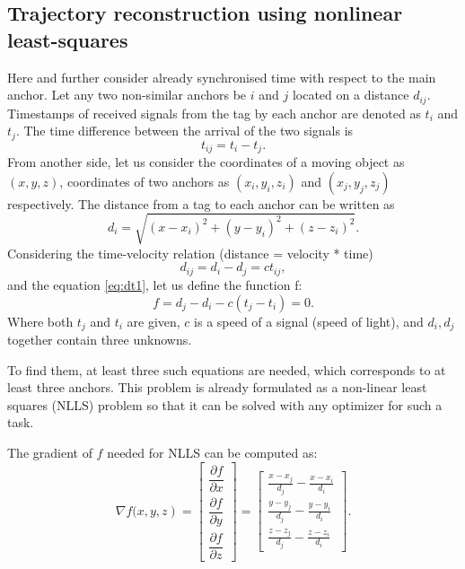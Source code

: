 \documentclass[journal]{IEEEtran}
\begin{document}
\subsection{Trajectory reconstruction using nonlinear least-squares}
\label{sec:traj_recon}
Here and further consider already synchronised time with respect to the main anchor.
Let any two non-similar anchors be $i$ and $j$ located on a distance $d_{ij}$.
Timestamps of received signals from the tag by each anchor are denoted as $t_i$ and $t_j$.
The time difference between the arrival of the two signals is
\begin{equation}
    {t}_{ij} = t_i - t_j.
    \label{eq:dt1}
\end{equation}
From another side, let us consider the coordinates of a moving object as $(x, y, z)$, coordinates of two anchors as $(x_i, y_i, z_i)$ and $(x_j, y_j, z_j)$ respectively.
The distance from a tag to each anchor can be written as
\begin{equation}
    d_i = \sqrt{(x-x_i)^2 + (y-y_i)^2 + (z - z_i)^2}.
    \label{eq:dist}
\end{equation}
Considering the time-velocity relation (distance = velocity * time) 
\begin{equation}
    \label{eq:ddcdt}
    {d}_{ij} = d_i - d_j = c{t}_{ij},
\end{equation}
and the equation \eqref{eq:dt1}, let us define the function f:
\begin{equation}
    \label{eq:f}
    f = d_j - d_i - c (t_j - t_i) = 0.
\end{equation}
Where both $t_j$ and $t_i$ are given, $c$ is a speed of a signal (speed of light), and $d_i, d_j$ together contain three unknowns. 

To find them, at least three such equations are needed, which corresponds to at least three anchors.
This problem is already formulated as a non-linear least squares (NLLS) problem so that it can be solved with any optimizer for such a task.

The gradient of $f$ needed for NLLS can be computed as:
\begin{equation}
    \nabla f(\left.x, y, z\right)=\left[\begin{array}{c}
    \dfrac{\partial f}{\partial x}\\
    \dfrac{\partial f}{\partial y}\\
    \dfrac{\partial f}{\partial z}
\end{array}\right] = \left[\begin{array}{c}
    \frac{x-x_j}{d_j} - \frac{x-x_i}{d_i}\\
    \frac{y-y_j}{d_j} - \frac{y-y_i}{d_i}\\
    \frac{z-z_j}{d_j} - \frac{z-z_i}{d_i}
    \end{array}\right].
\end{equation}
\end{document}
